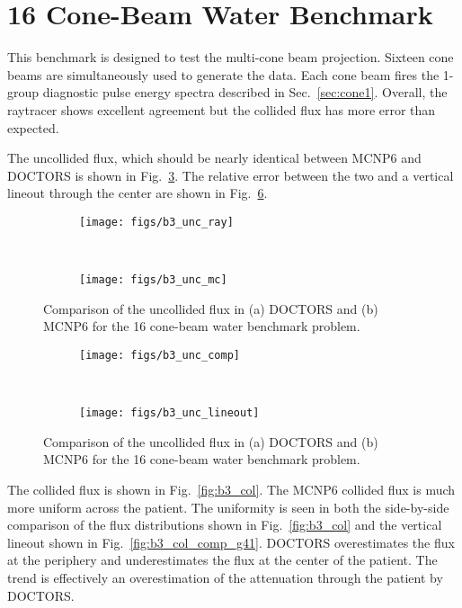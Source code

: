 \section{16 Cone-Beam Water Benchmark}

This benchmark is designed to test the multi-cone beam projection. Sixteen cone beams are simultaneously used to generate the data. Each cone beam fires the 1-group diagnostic pulse energy spectra described in Sec.~\ref{sec:cone1}. Overall, the raytracer shows excellent agreement but the collided flux has more error than expected.

The uncollided flux, which should be nearly identical between MCNP6 and DOCTORS is shown in Fig.~\ref{fig:b3_unc}. The relative error between the two and a vertical lineout through the center are shown in Fig.~\ref{fig:b3_comp}.

\begin{figure}
    \centering
    \begin{subfigure}[b]{0.45\textwidth}
        \texttt{[image: figs/b3\_unc\_ray]}
        \caption{}
        \label{fig:b3_dr_unc}
    \end{subfigure}
    ~
    \begin{subfigure}[b]{0.45\textwidth}
        \texttt{[image: figs/b3\_unc\_mc]}
        \caption{}
        \label{fig:b3_mc_unc}
    \end{subfigure}
    \caption{Comparison of the uncollided flux in (a) DOCTORS and (b) MCNP6 for the 16 cone-beam water benchmark problem.}\label{fig:b3_unc}
\end{figure}

\begin{figure}
    \centering
    \begin{subfigure}[b]{0.45\textwidth}
        \texttt{[image: figs/b3\_unc\_comp]}
        \caption{}
        \label{fig:b3_unc_comp}
    \end{subfigure}
    ~
    \begin{subfigure}[b]{0.45\textwidth}
        \texttt{[image: figs/b3\_unc\_lineout]}
        \caption{}
        \label{fig:b3_unc_lineout}
    \end{subfigure}
    \caption{Comparison of the uncollided flux in (a) DOCTORS and (b) MCNP6 for the 16 cone-beam water benchmark problem.}\label{fig:b3_comp}
\end{figure}

The collided flux is shown in Fig.~\ref{fig:b3_col}. The MCNP6 collided flux is much more uniform across the patient. The uniformity is seen in both the side-by-side comparison of the flux distributions shown in Fig.~\ref{fig:b3_col} and the vertical lineout shown in Fig.~\ref{fig:b3_col_comp_g41}. DOCTORS overestimates the flux at the periphery and underestimates the flux at the center of the patient. The trend is effectively an overestimation of the attenuation through the patient by DOCTORS.

